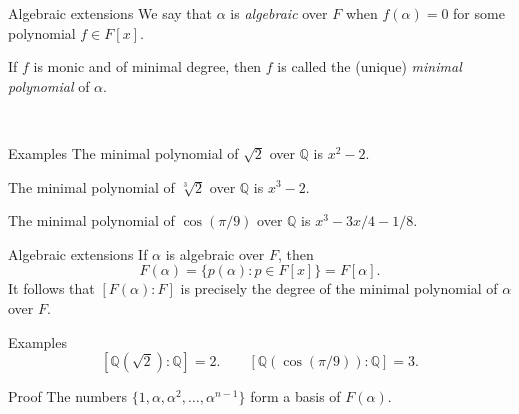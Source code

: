 \documentclass[handout]{beamer}
\def\Q{\mathbb{Q}}
\begin{document}
    \begin{frame}{Algebraic extensions}
        We say that $\alpha$ is \emph{algebraic} over $F$ when $f(\alpha) = 0$ for
        some polynomial $f \in F[x]$.

        If $f$ is monic and of minimal degree, then $f$ is called the (unique)
        \emph{minimal polynomial} of $\alpha$.

        ~\\\pause

        \begin{exampleblock}{Examples} \vspace{0.1em}
            The minimal polynomial of $\sqrt{2}$ over $\Q$ is $x^2 - 2$.

            The minimal polynomial of $\sqrt[3]{2}$ over $\Q$ is $x^3 - 2$.

            The minimal polynomial of $\cos(\pi / 9)$ over $\Q$ is $x^3 - 3x/4 -
            1/8$.
        \end{exampleblock}
    \end{frame}

    \begin{frame}{Algebraic extensions}
        If $\alpha$ is algebraic over $F$, then \[
            F(\alpha) = \{p(\alpha) : p \in F[x]\} = F[\alpha].
        \] It follows that $[F(\alpha) : F]$ is precisely the degree of the minimal
        polynomial of $\alpha$ over $F$.

        \pause

        \begin{exampleblock}{Examples} \vspace{0.1em} \[ [\Q(\sqrt{2}) : \Q] = 2.
        \qquad [\Q(\cos(\pi / 9)) : \Q] =  3.  \] \end{exampleblock}

        \pause

        \begin{block}{Proof} \vspace{0.1em} The numbers $\{1, \alpha, \alpha^2,
        \dots, \alpha^{n - 1}\}$ form a basis of $F(\alpha)$.  \end{block}

    \end{frame}
\end{document}
